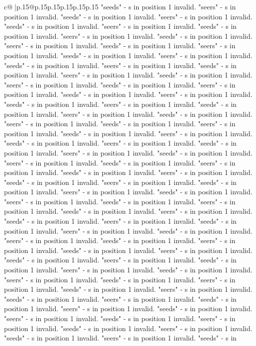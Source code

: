 \documentclass{article}
\begin{document}
{\begin{supertabular}{c@{$\;$}|p{.15\linewidth}@{}p{.15\linewidth}p{.15\linewidth}p{.15\linewidth}p{.15\linewidth}p{.15\linewidth}}
{{{"seeds" {-} s in position 1 invalid. "seers" {-} s in position 1 invalid. "seeds" {-} s in position 1 invalid. "seers" {-} s in position 1 invalid. "seeds" {-} s in position 1 invalid. "seers" {-} s in position 1 invalid. "seeds" {-} s in position 1 invalid. "seers" {-} s in position 1 invalid. "seeds" {-} s in position 1 invalid. "seers" {-} s in position 1 invalid. "seeds" {-} s in position 1 invalid. "seers" {-} s in position 1 invalid. "seeds" {-} s in position 1 invalid. "seers" {-} s in position 1 invalid. "seeds" {-} s in position 1 invalid. "seers" {-} s in position 1 invalid. "seeds" {-} s in position 1 invalid. "seers" {-} s in position 1 invalid. "seeds" {-} s in position 1 invalid. "seers" {-} s in position 1 invalid. "seeds" {-} s in position 1 invalid. "seers" {-} s in position 1 invalid. "seeds" {-} s in position 1 invalid. "seers" {-} s in position 1 invalid. "seeds" {-} s in position 1 invalid. "seers" {-} s in position 1 invalid. "seeds" {-} s in position 1 invalid. "seers" {-} s in position 1 invalid. "seeds" {-} s in position 1 invalid. "seers" {-} s in position 1 invalid. "seeds" {-} s in position 1 invalid. "seers" {-} s in position 1 invalid. "seeds" {-} s in position 1 invalid. "seers" {-} s in position 1 invalid. "seeds" {-} s in position 1 invalid. "seers" {-} s in position 1 invalid. "seeds" {-} s in position 1 invalid. "seers" {-} s in position 1 invalid. "seeds" {-} s in position 1 invalid. "seers" {-} s in position 1 invalid. "seeds" {-} s in position 1 invalid. "seers" {-} s in position 1 invalid. "seeds" {-} s in position 1 invalid. "seers" {-} s in position 1 invalid. "seeds" {-} s in position 1 invalid. "seers" {-} s in position 1 invalid. "seeds" {-} s in position 1 invalid. "seers" {-} s in position 1 invalid. "seeds" {-} s in position 1 invalid. "seers" {-} s in position 1 invalid. "seeds" {-} s in position 1 invalid. "seers" {-} s in position 1 invalid. "seeds" {-} s in position 1 invalid. "seers" {-} s in position 1 invalid. "seeds" {-} s in position 1 invalid. "seers" {-} s in position 1 invalid. "seeds" {-} s in position 1 invalid. "seers" {-} s in position 1 invalid. "seeds" {-} s in position 1 invalid. "seers" {-} s in position 1 invalid. "seeds" {-} s in position 1 invalid. "seers" {-} s in position 1 invalid. "seeds" {-} s in position 1 invalid. "seers" {-} s in position 1 invalid. "seeds" {-} s in position 1 invalid. "seers" {-} s in position 1 invalid. "seeds" {-} s in position 1 invalid. "seers" {-} s in position 1 invalid. "seeds" {-} s in position 1 invalid. "seers" {-} s in position 1 invalid. "seeds" {-} s in position 1 invalid. "seers" {-} s in position 1 invalid. "seeds" {-} s in position 1 invalid. "seers" {-} s in position 1 invalid. "seeds" {-} s in position 1 invalid. "seers" {-} s in position 1 invalid. "seeds" {-} s in position 1 invalid. "seers" {-} s in position 1 invalid. "seeds" {-} s in position 1 invalid. "seers" {-} s in position 1 invalid. "seeds" {-} s in position 1 invalid. "seers" {-} s in position 1 invalid. "seeds" {-} s in position 1 invalid. "seers" {-} s in position 1 invalid. "seeds" {-} s in position 1 invalid. "seers" {-} s in position 1 invalid. "seeds" {-} s in }}}
\end{supertabular}}
\end{document}
